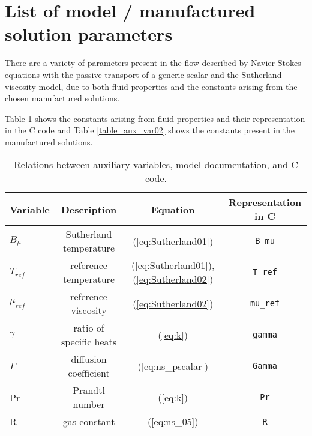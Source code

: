 \section{List of model / manufactured solution parameters}\label{Appendix:01}

There are a variety of parameters present in the flow described by Navier-Stokes equations with the passive transport of a generic scalar and the Sutherland viscosity model, due to both fluid properties and the constants arising from the chosen manufactured solutions.



Table \ref{table_aux_var} shows the constants arising from fluid properties and their representation in the C code and Table \ref{table_aux_var02} shows the constants present in the manufactured solutions.


\begin{table}[htb]
\caption{Relations between auxiliary variables, model documentation, and C code.}
\centering
\begin{tabular}{l c c c}
\hline\hline
     Variable    &  Description & Equation &Representation in C  \\ [0.25ex]
\hline 
$B_\mu$   	& Sutherland temperature			& (\ref{eq:Sutherland01})	& \texttt{B\_mu}		\vspace{2pt} \\
$T_{ref}$ 	& reference temperature					& (\ref{eq:Sutherland01}), (\ref{eq:Sutherland02})	& \texttt{T\_ref}		\vspace{2pt} \\
$\mu_{ref}$	& reference viscosity					& (\ref{eq:Sutherland02})	& \texttt{mu\_ref} 	\vspace{2pt} \\
$\gamma$	& ratio of specific heats				& (\ref{eq:k})			& \texttt{gamma}		\vspace{2pt} \\
$\Gamma$	& diffusion coefficient					& (\ref{eq:ns_pscalar})	& \texttt{Gamma}		\vspace{2pt} \\
Pr			& Prandtl number						& (\ref{eq:k})			& \texttt{Pr}		\vspace{2pt} \\
R			& gas constant							& (\ref{eq:ns_05})		& \texttt{R}			\vspace{2pt} \\
\hline
\end{tabular}
\label{table_aux_var}
\end{table}

